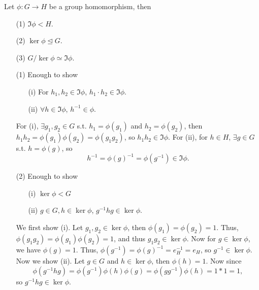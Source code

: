 \begin{eg}
    Let \(\phi : G \to H\) be a group homomorphism, then 
    \begin{itemize}
        \item [(1)] \(\Im \phi < H\). 
        \item [(2)] \(\ker \phi \trianglelefteq G\). 
        \item [(3)] \(G / \ker \phi \simeq \Im \phi \).   
    \end{itemize} 
\end{eg}
\begin{explanation}
    \vphantom{text}
    \begin{itemize}
        \item [(1)] Enough to show 
        \begin{itemize}
            \item [(i)] For \(h_1, h_2 \in \Im \phi \), \(h_1 \cdot h_2 \in \Im \phi \).  
            \item [(ii)] \(\forall h \in \Im \phi \), \(h^{-1} \in \phi  \).   
        \end{itemize}
        For (i), \(\exists g_1, g_2 \in G\) s.t. \(h_1 = \phi \left( g_1 \right) \) and \(h_2 = \phi \left( g_2 \right) \), then \(h_1 h_2 = \phi (g_1) \phi (g_2) = \phi (g_1 g_2)\), so \(h_1 h_2 \in \Im \phi \). For (ii), for \(h \in H\), \(\exists g \in G\) s.t. \(h = \phi (g)\), so 
        \[
            h^{-1} = \phi (g)^{-1} = \phi (g^{-1}) \in \Im \phi .  
        \]       
        \item [(2)] Enough to show 
        \begin{itemize}
            \item [(i)] \(\ker \phi < G\)
            \item [(ii)] \(g \in G, h \in \ker \phi \), \(g^{-1} h g \in \ker \phi  \).   
        \end{itemize}
        We first show (i). Let \(g_1, g_2 \in \ker \phi \), then \(\phi (g_1) = \phi (g_2) = 1\). Thus, \(\phi (g_1 g_2) = \phi (g_1) \phi (g_2) = 1\), and thus \(g_1 g_2 \in \ker \phi \). Now for \(g \in \ker \phi \), we have \(\phi (g) = 1\). Thus, \(\phi \left( g^{-1}  \right) = \phi (g)^{-1} = e_H^{-1} = e_H  \), so \(g^{-1} \in \ker \phi \). Now we show (ii). Let \(g \in G\) and \(h \in \ker \phi \), then \(\phi (h) = 1\). Now since
        \[
            \phi  \left( g^{-1} h g \right) = \phi \left( g^{-1} \right) \phi (h) \phi (g) = \phi \left( g g^{-1} \right) \phi (h) = 1 * 1 = 1,   
        \] so \(g^{-1} h g \in \ker \phi \).

\end{itemize}
\end{explanation}
